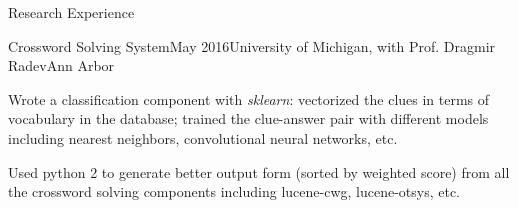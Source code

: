 \documentclass{resume} %
\begin{document}
\begin{rSection}{Research Experience}
	\begin{rSubsection}{Crossword Solving System}{May 2016}{University of Michigan, with Prof. Dragmir Radev}{Ann Arbor}
	\item Wrote a classification component with \textit{sklearn}: vectorized the clues in terms of vocabulary in the database; trained the clue-answer pair with different models including nearest neighbors, convolutional neural networks, etc.
	\item Used python 2 to generate better output form (sorted by weighted score) from all the crossword solving components including lucene-cwg, lucene-otsys, etc.
	\end{rSubsection}
\end{rSection}
%
%	
%	
%	
%	
%	
%		
\end{document}
